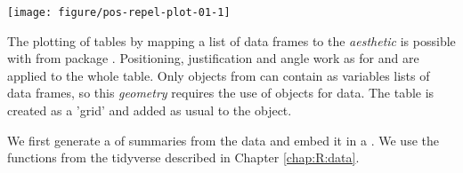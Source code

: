 \documentclass[krantz2]{krantz}\usepackage{knitr}%
\begin{document}
\begin{knitrout}\footnotesize
{}\color{fgcolor}\begin{kframe}
\begin{alltt}
\hlstd{(}  \hlstd{(}   
                           \hlstd{=} 
                           
                            \hlopt{+}
  \hlstd{()} \hlopt{+}
  \hlstd{(} \hlstd{=} \hlopt{/}\hlstd{)} \hlopt{+}
  \hlstd{(} \hlstd{=} \hlstd{,}  \hlstd{=} \hlstd{,}
                   \hlstd{=} \hlstd{,}  \hlstd{=} \hlstd{)}
\end{alltt}
\end{kframe}

{\centering \texttt{[image: figure/pos-repel-plot-01-1]} 

}



\end{knitrout}

The plotting of tables by mapping a list of data frames to the  \emph{aesthetic} is possible with  from package . Positioning, justification and angle work as for  and are applied to the whole table. Only  objects from  can contain as variables lists of data frames, so this \emph{geometry} requires the use of  objects for data. The table is created as a 'grid'  and added as usual to the  object.

We first generate a  of summaries from the data and embed it in a . We use the functions from the tidyverse described in Chapter \ref{chap:R:data}.

\begin{knitrout}\footnotesize
{}\color{fgcolor}
\end{knitrout}
\end{document}
